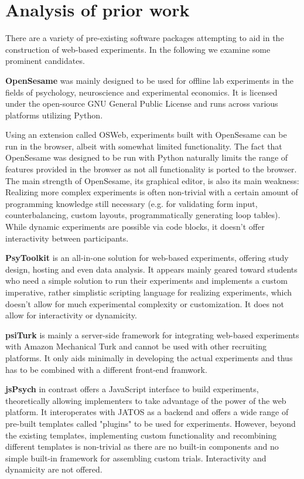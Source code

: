 \documentclass[a4paper,11pt]{scrreprt}
\begin{document}
\chapter{Analysis of prior work}
There are a variety of pre-existing software packages attempting to aid in the construction of web-based experiments. In the following we examine some prominent candidates.

\textbf{OpenSesame} \citep{Mathot2012} was mainly designed to be used for offline lab experiments in the fields of psychology, neuroscience and experimental economics. It is licensed under the open-source GNU General Public License and runs across various platforms utilizing Python.

Using an extension called OSWeb, experiments built with OpenSesame can be run in the browser, albeit with somewhat limited functionality. The fact that OpenSesame was designed to be run with Python naturally limits the range of features provided in the browser as not all functionality is ported to the browser. The main strength of OpenSesame, its graphical editor, is also its main weakness: Realizing more complex experiments is often non-trivial with a certain amount of programming knowledge still necessary (e.g. for validating form input, counterbalancing, custom layouts, programmatically generating loop tables). While dynamic experiments are possible via code blocks, it doesn't offer interactivity between participants.

\textbf{PsyToolkit} \citep{Stoet2012} is an all-in-one solution for web-based experiments, offering study design, hosting and even data analysis. It appears mainly geared toward students who need a simple solution to run their experiments and implements a custom imperative, rather simplistic scripting language for realizing experiments, which doesn't allow for much experimental complexity or customization. It does not allow for interactivity or dynamicity.

\textbf{psiTurk} \citep{Gureckis2016} is mainly a server-side framework for integrating web-based experiments with Amazon Mechanical Turk and cannot be used with other recruiting platforms. It only aids minimally in developing the actual experiments and thus has to be combined with a different front-end framwork.

\textbf{jsPsych} \citep{Leeuw2015} in contrast offers a JavaScript interface to build experiments, theoretically allowing implementers to take advantage of the power of the web platform. It interoperates with JATOS \citep{Lange2015} as a backend and offers a wide range of pre-built templates called "plugins" to be used for experiments. However, beyond the existing templates, implementing custom functionality and recombining different templates is non-trivial as there are no built-in components and no simple built-in framework for assembling custom trials. Interactivity and dynamicity are not offered.
\end{document}
